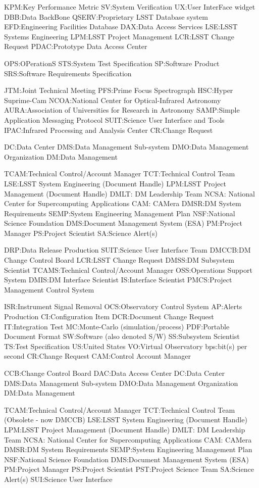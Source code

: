 KPM:Key Performance Metric
SV:System Verification
UX:User InterFace widget
DBB:Data BackBone
QSERV:Proprietary LSST Database system
EFD:Engineering Facilities Database  
DAX:Data Access Services
LSE:LSST Systems Engineering
LPM:LSST Project Management
LCR:LSST Change Request
PDAC:Prototype Data Access Center

OPS:OPerationS
STS:System Test Specification
SP:Software Product
SRS:Software Requirements Specification

JTM:Joint Technical Meeting
PFS:Prime Focus Spectrograph
HSC:Hyper Suprime-Cam
NCOA:National Center for Optical-Infrared Astronomy 
AURA:Association of Universities for Research in Astronomy
SAMP:Simple Application Messaging Protocol
SUIT:Science User Interface and Tools
IPAC:Infrared Processing and Analysis Center 
CR:Change Request

DC:Data Center
DMS:Data Management Sub-system
DMO:Data Management Organization
DM:Data Management

TCAM:Technical Control/Account Manager
TCT:Technical Control Team
LSE:LSST System Engineering (Document Handle)
LPM:LSST Project Management (Document Handle)
DMLT: DM Leadership Team
NCSA: National Center for Supercomputing Applications
CAM: CAMera
DMSR:DM System Requirements
SEMP:System Engineering Management Plan
NSF:National Science Foundation
DMS:Document Management System (ESA)
PM:Project Manager
PS:Project Scientist
SA:Science Alert(s)

DRP:Data Release Production
SUIT:Science User Interface Team
DMCCB:DM Change Control Board
LCR:LSST Change Request
DMSS:DM Subsystem Scientist
TCAMS:Technical Control/Account Manager
OSS:Operations Support System
DMIS:DM Interface Scientist
IS:Interface Scientist
PMCS:Project Management Control System

ISR:Instrument Signal Removal
OCS:Observatory Control System
AP:Alerts Production
CI:Configuration Item
DCR:Document Change Request
IT:Integration Test
MC:Monte-Carlo (simulation/process)
PDF:Portable Document Format
SW:Software (also denoted S/W)
SS:Subsystem Scientist
TS:Test Specification
US:United States
VO:Virtual Observatory
bps:bit(s) per second
CR:Change Request
CAM:Control Account Manager

CCB:Change Control Board 
DAC:Data Access Center
DC:Data Center
DMS:Data Management Sub-system
DMO:Data Management Organization
DM:Data Management

TCAM:Technical Control/Account Manager
TCT:Technical Control Team (Obsolete - now DMCCB)
LSE:LSST System Engineering (Document Handle)
LPM:LSST Project Management (Document Handle)
DMLT: DM Leadership Team
NCSA: National Center for Supercomputing Applications
CAM: CAMera
DMSR:DM System Requirements
SEMP:System Engineering Management Plan
NSF:National Science Foundation
DMS:Document Management System (ESA)
PM:Project Manager
PS:Project Scientist
PST:Project Science Team
SA:Science Alert(s)
SUI:Science User Interface
